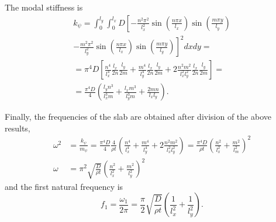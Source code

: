 \documentclass{article}
\begin{document}
The modal stiffness is
\begin{multline*}
k_\psi =
\int_0^{l_y}\int_0^{l_x}D \left[-\frac{n^2\pi^2}{l_x^2} \sin\left(\frac{n\pi x}{l_x}\right) \sin\left(\frac{m\pi y}{l_y}\right)\right.\\
\left.-\frac{m^2\pi^2}{l_y^2} \sin\left(\frac{n\pi x}{l_x}\right) \sin\left(\frac{m\pi y}{l_y}\right) \right]^2 dxdy = \\
= \pi^4D \left[ \frac{n^4}{l_x^4}\frac{l_x}{2n}\frac{l_y}{2m} + \frac{m^4}{l_y^4}\frac{l_x}{2n}\frac{l_y}{2m}
+ 2\frac{n^2m^2}{l_x^2l_y^2}\frac{l_x}{2n}\frac{l_y}{2m} \right] = \\
= \frac{\pi^4D}{4}\left(\frac{l_yn^3}{l_x^3m} + \frac{l_xm^3}{l_y^3m} + \frac{2mn}{l_xl_y}\right).
\end{multline*}

Finally, the frequencies of the slab are obtained after division of the above results,
\begin{align*}
\omega^2 &= \frac{k_\psi}{m_\psi} = \frac{\pi^4D}{4}\frac{4}{\rho t}
\left(\frac{n^4}{l_x^4} + \frac{m^4}{l_y^4} + 2\frac{n^2m^2}{l_x^2l_y^2}\right)
= \frac{\pi^4D}{\rho t}\left(\frac{n^2}{l_x^2} + \frac{m^2}{l_m^2}\right)^2 \\
\omega &= \pi^2\sqrt{\frac{D}{\rho t}} \left(\frac{n^2}{l_x^2} + \frac{m^2}{l_y^2}\right)^2
\end{align*}
and the first natural frequency is
\begin{equation*}
f_1 = \frac{\omega_1}{2\pi} = \frac{\pi}{2}\sqrt{\frac{D}{\rho t}} \left(\frac{1}{l_x^2} + \frac{1}{l_y^2}\right).
\end{equation*}
\end{document}
